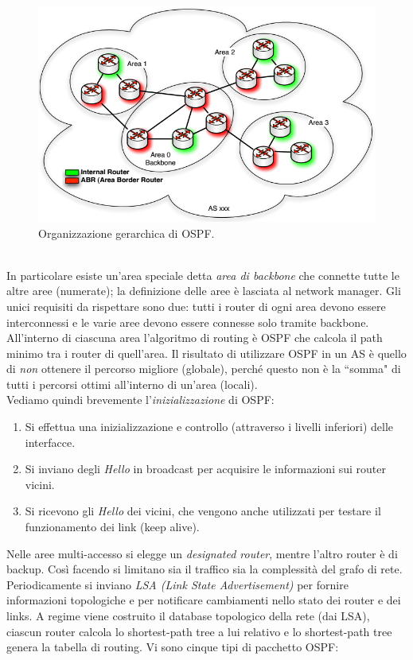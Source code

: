 \begin{figure}[htbp]
	\centering
	\includegraphics[scale = 0.5]{images/OSPF}
	\caption{Organizzazione gerarchica di OSPF.}
	\label{img:OSPF}
\end{figure}\\
In particolare esiste un'area speciale detta \textit{area di backbone} che connette tutte le altre aree (numerate); la definizione delle aree è lasciata al network manager. Gli unici requisiti da rispettare sono due: tutti i router di ogni area devono essere interconnessi e le varie aree devono essere connesse solo tramite backbone. All'interno di ciascuna area l'algoritmo di routing è OSPF che calcola il path minimo tra i router di quell'area. Il risultato di utilizzare OSPF in un AS è quello di \textit{non} ottenere il percorso migliore (globale), perché questo non è la \textquotedblleft somma" di tutti i percorsi ottimi all'interno di un'area (locali).\\
Vediamo quindi brevemente l'\textit{inizializzazione} di OSPF:
\begin{enumerate}
	\item Si effettua una inizializzazione e controllo (attraverso i livelli inferiori) delle interfacce.
	\item Si inviano degli \textit{Hello} in broadcast per acquisire le informazioni sui router vicini.
	\item Si ricevono gli \textit{Hello} dei vicini, che vengono anche utilizzati per testare il funzionamento dei link (keep alive).
\end{enumerate}
Nelle aree multi-accesso si elegge un \textit{designated router}, mentre l'altro router è di backup. Così facendo si limitano sia il traffico sia la complessità del grafo di rete. Periodicamente si inviano \textit{LSA (Link State Advertisement)} per fornire informazioni topologiche e per notificare cambiamenti nello stato dei router e dei links. A regime viene costruito il database topologico della rete (dai LSA), ciascun router calcola lo shortest-path tree a lui relativo e lo shortest-path tree genera la tabella di routing. Vi sono cinque tipi di pacchetto OSPF:
